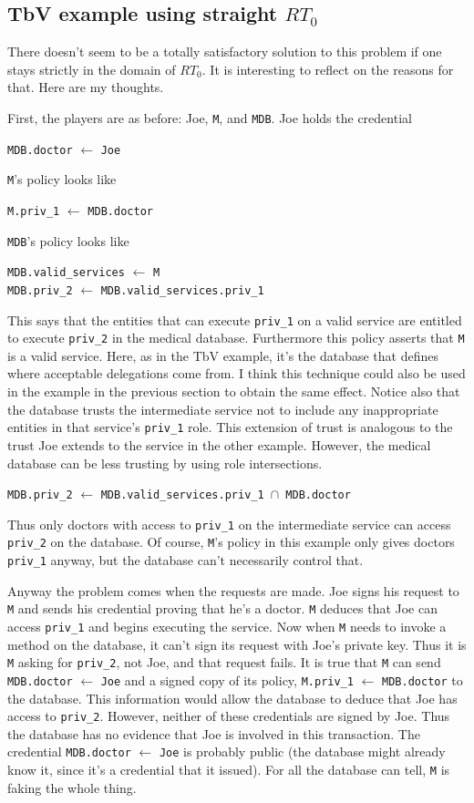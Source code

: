 \documentclass{article}
\newcommand{\memcert}[2]{\texttt{#1} $\leftarrow$ \texttt{#2}}
\begin{document}
\subsection{TbV example using straight $RT_0$}

There doesn't seem to be a totally satisfactory solution to this problem if one stays strictly
in the domain of $RT_0$. It is interesting to reflect on the reasons for that. Here are my
thoughts.

First, the players are as before: Joe, \texttt{M}, and \texttt{MDB}. Joe holds the credential

\memcert{MDB.doctor}{Joe}

\texttt{M}'s policy looks like

\memcert{M.priv\_1}{MDB.doctor}

\texttt{MDB}'s policy looks like

\memcert{MDB.valid\_services}{M} \\
\memcert{MDB.priv\_2}{MDB.valid\_services.priv\_1}

This says that the entities that can execute \texttt{priv\_1} on a valid service are entitled to
execute \texttt{priv\_2} in the medical database. Furthermore this policy asserts that
\texttt{M} is a valid service. Here, as in the TbV example, it's the database that defines where
acceptable delegations come from. I think this technique could also be used in the example in
the previous section to obtain the same effect. Notice also that the database trusts the
intermediate service not to include any inappropriate entities in that service's
\texttt{priv\_1} role. This extension of trust is analogous to the trust Joe extends to the
service in the other example. However, the medical database can be less trusting by using role
intersections.

\memcert{MDB.priv\_2}{MDB.valid\_services.priv\_1 $\cap$ MDB.doctor}

Thus only doctors with access to \texttt{priv\_1} on the intermediate service can access
\texttt{priv\_2} on the database. Of course, \texttt{M}'s policy in this example only gives
doctors \texttt{priv\_1} anyway, but the database can't necessarily control that.

Anyway the problem comes when the requests are made. Joe signs his request to \texttt{M} and
sends his credential proving that he's a doctor. \texttt{M} deduces that Joe can access
\texttt{priv\_1} and begins executing the service. Now when \texttt{M} needs to invoke a method
on the database, it can't sign its request with Joe's private key. Thus it is \texttt{M} asking
for \texttt{priv\_2}, not Joe, and that request fails. It is true that \texttt{M} can send
\memcert{MDB.doctor}{Joe} and a signed copy of its policy, \memcert{M.priv\_1}{MDB.doctor} to
the database. This information would allow the database to deduce that Joe has access to
\texttt{priv\_2}. However, neither of these credentials are signed by Joe. Thus the database has
no evidence that Joe is involved in this transaction. The credential \memcert{MDB.doctor}{Joe}
is probably public (the database might already know it, since it's a credential that it issued).
For all the database can tell, \texttt{M} is faking the whole thing.
\end{document}
